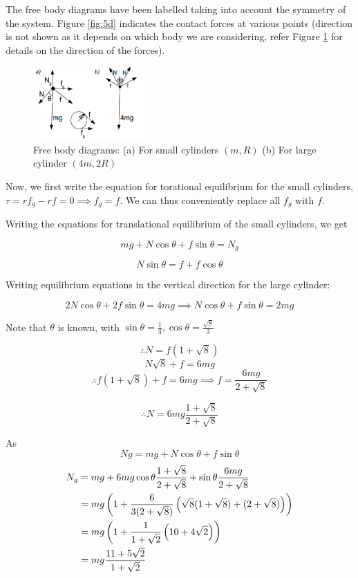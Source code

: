 \documentclass[12pt]{article}
\begin{document}
The free body diagrams have been labelled taking into account the symmetry of the system. Figure \ref{fig:5d} indicates the contact forces at various points (direction is not shown as it  depends on which body we are considering, refer Figure \ref{fig:5f} for details on the direction of the forces).
\begin{figure}
  \begin{center}
    \includegraphics[width=0.38\textwidth]{5F}
  \end{center}
  
  \caption{\footnotesize Free body diagrams: (a) For small cylinders $(m,R)$ (b) For large cylinder $(4m,2R)$}
  \label{fig:5f}
\end{figure} 
Now, we first write the equation for torational equilibrium for the small cylinders, $\tau=rf_g-rf=0 \implies f_g=f$. We can thus conveniently replace all $f_g$ with $f$.

Writing the equations for translational equilibrium of the small cylinders, we get

\newcommand{\ccc}{\cos\theta}
\newcommand{\sss}{\sin\theta}

$$mg + N\ccc +f\sss = N_g$$

$$N\sss =f+f\ccc$$

Writing equilibrium equations in the vertical direction for the large cylinder:

$$2N\ccc+2f\sss=4mg\implies N\ccc +f\sss=2mg$$

Note that $\theta$ is known, with $\sss=\frac13, \ccc=\frac{\sqrt8}3$

$$\therefore N=f(1+\sqrt8)$$
$$N\sqrt 8 +f=6mg$$
$$\therefore f(1+\sqrt 8) + f =6mg\implies f=\frac{6mg}{2+\sqrt 8}$$

$$\therefore N=6mg\frac{1+\sqrt8}{2+\sqrt8}$$

As $$Ng=mg + N\ccc +f\sss $$
\begin{align}
N_g &= mg + 6mg\ccc\frac{1+\sqrt8}{2+\sqrt8} + \sss\frac{6mg}{2+\sqrt 8}\notag\\
 &= mg \left(1 + \frac{6}{3(2+\sqrt 8)}\left(\sqrt8(1+\sqrt8) + (2+\sqrt8)\right) \right)\notag\\
 &= mg\left(1+\frac{1}{1+\sqrt 2}\left(10+4\sqrt2\right)\right )\notag\\ 
 &=mg\frac{11+5\sqrt 2}{1+\sqrt 2}\notag
\end{align}
\end{document}
